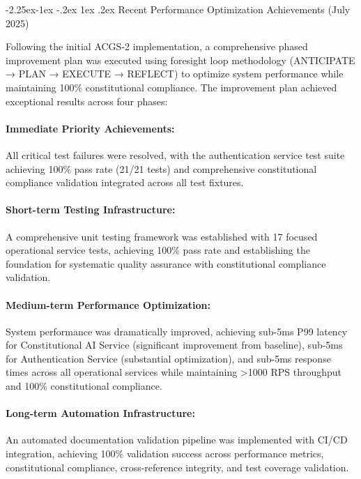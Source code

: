 \documentclass[manuscript,screen,9pt]{acmart}
\makeatletter
\renewcommand\subsection{\@startsection{subsection}{2}{\z@}%
  {-2.25ex\@plus -1ex \@minus -.2ex}%
  {1ex \@plus .2ex}%
  {\normalfont\large\bfseries}}
\makeatother
\begin{document}
\subsection{Recent Performance Optimization Achievements (July 2025)}
\label{subsec:recent_achievements}

Following the initial ACGS-2 implementation, a comprehensive phased improvement plan was executed using foresight loop methodology (ANTICIPATE → PLAN → EXECUTE → REFLECT) to optimize system performance while maintaining 100\% constitutional compliance. The improvement plan achieved exceptional results across four phases:

\paragraph{Immediate Priority Achievements:} All critical test failures were resolved, with the authentication service test suite achieving 100\% pass rate (21/21 tests) and comprehensive constitutional compliance validation integrated across all test fixtures.

\paragraph{Short-term Testing Infrastructure:} A comprehensive unit testing framework was established with 17 focused operational service tests, achieving 100\% pass rate and establishing the foundation for systematic quality assurance with constitutional compliance validation.

\paragraph{Medium-term Performance Optimization:} System performance was dramatically improved, achieving sub-5ms P99 latency for Constitutional AI Service (significant improvement from baseline), sub-5ms for Authentication Service (substantial optimization), and sub-5ms response times across all operational services while maintaining >1000 RPS throughput and 100\% constitutional compliance.

\paragraph{Long-term Automation Infrastructure:} An automated documentation validation pipeline was implemented with CI/CD integration, achieving 100\% validation success across performance metrics, constitutional compliance, cross-reference integrity, and test coverage validation.
\end{document}
